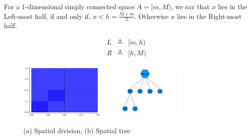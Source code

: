 \documentclass{juliacon}
\begin{document}
\begin{definition}
  For a $1$-dimensional simply connected space $A = [m, M)$, we say that
  $x$ lies in the Left-most half, if and only if, $x<h=\frac{M+m}{2}$.
  Otherwise $x$ lies in the Right-most half.

  $$
  \begin{matrix}
    L &\triangleq& [m, h) \\
    R &\triangleq& [h, M)
  \end{matrix}
  $$

  \begin{figure}
    \centerline{
      \includegraphics[width=10pc]{figures/spatial-division.png}
      \includegraphics[width=10pc]{figures/spatial-tree.png}
    }
    \caption{ (a) Spatial division, (b) Spatial tree }
    \label{spatial-tree}
  \end{figure}

\end{definition}
\end{document}
